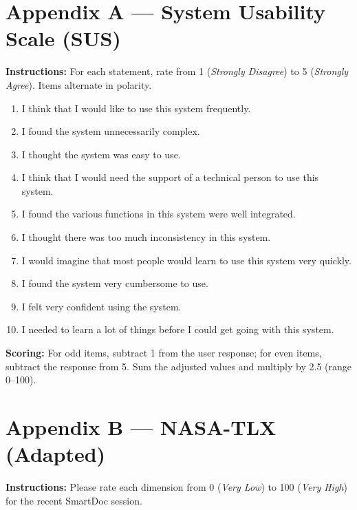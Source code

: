 
\appendix

\chapter*{Appendix A — System Usability Scale (SUS)}
\label{app:sus}

\noindent
\textbf{Instructions:}  
For each statement, rate from 1 (\emph{Strongly Disagree}) to 5 (\emph{Strongly Agree}).
Items alternate in polarity.

\begin{enumerate}
  \item I think that I would like to use this system frequently.
  \item I found the system unnecessarily complex.
  \item I thought the system was easy to use.
  \item I think that I would need the support of a technical person to use this system.
  \item I found the various functions in this system were well integrated.
  \item I thought there was too much inconsistency in this system.
  \item I would imagine that most people would learn to use this system very quickly.
  \item I found the system very cumbersome to use.
  \item I felt very confident using the system.
  \item I needed to learn a lot of things before I could get going with this system.
\end{enumerate}

\noindent
\textbf{Scoring:}  
For odd items, subtract 1 from the user response; for even items, subtract the response
from 5.  
Sum the adjusted values and multiply by 2.5 (range 0–100).

\chapter*{Appendix B — NASA-TLX (Adapted)}
\label{app:nasa}

\noindent
\textbf{Instructions:}  
Please rate each dimension from 0 (\emph{Very Low}) to 100 (\emph{Very High})
for the recent SmartDoc session.

